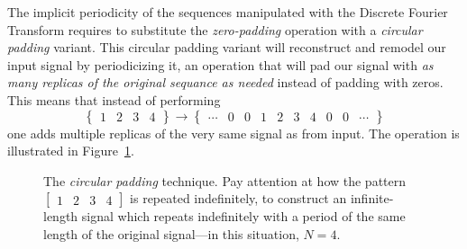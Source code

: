 \documentclass[\documentfontsize, twocolumn]{\classname}
\begin{document}
The implicit periodicity of the sequences manipulated with the Discrete Fourier Transform requires to substitute the \emph{zero-padding} operation with a \emph{circular padding} variant. This circular padding variant will reconstruct and remodel our input signal by periodicizing it, an operation that will pad our signal with \emph{as many replicas of the original sequance as needed} instead of padding with zeros. This means that instead of performing
\[
    \begin{Bmatrix} 1 & 2 & 3 & 4 \end{Bmatrix} \rightarrow \begin{Bmatrix} \cdots & 0 & 0 & 1 & 2 & 3 & 4 & 0 & 0 & \cdots\end{Bmatrix}
\]
one adds multiple replicas of the very same signal as from input. The operation is illustrated in Figure~\ref{tikz:circularZeroPadding}.

\begin{figure}[ht]
\begin{center}
    \end{center}\caption{The \emph{circular padding} technique. Pay attention at how the pattern $\begin{bmatrix} 1 & 2 & 3 & 4 \end{bmatrix}$ is repeated indefinitely, to construct an infinite-length signal which repeats indefinitely with a period of the same length of the original signal---in this situation, $N=4$.}\label{tikz:circularZeroPadding}
\end{figure}
\end{document}

